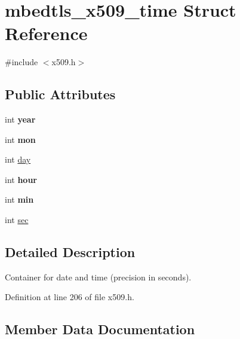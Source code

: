 \hypertarget{structmbedtls__x509__time}{}\section{mbedtls\+\_\+x509\+\_\+time Struct Reference}
\label{structmbedtls__x509__time}


{\ttfamily \#include $<$x509.\+h$>$}

\subsection*{Public Attributes}
\begin{DoxyCompactItemize}
\item 
\mbox{\label{structmbedtls__x509__time_a8a7e1d3481392216ebf374174ad9391f}} 
int {\bfseries year}
\item 
\mbox{\label{structmbedtls__x509__time_aea98403aec3bfd6790c308f3a7f36add}} 
int {\bfseries mon}
\item 
int \mbox{\hyperlink{structmbedtls__x509__time_a20712c77a94123d4610c87d6863cf092}{day}}
\item 
\mbox{\label{structmbedtls__x509__time_a163b3884c0b321a1d5cccf85ab79ad76}} 
int {\bfseries hour}
\item 
\mbox{\label{structmbedtls__x509__time_aa4a3bcdc60bbdc3a3bb346ae65c89b65}} 
int {\bfseries min}
\item 
int \mbox{\hyperlink{structmbedtls__x509__time_a267d51d8fbecde50b06b883db7f98ec2}{sec}}
\end{DoxyCompactItemize}


\subsection{Detailed Description}
Container for date and time (precision in seconds). 

Definition at line 206 of file x509.\+h.



\subsection{Member Data Documentation}
\mbox{\label{structmbedtls__x509__time_a20712c77a94123d4610c87d6863cf092}} 
